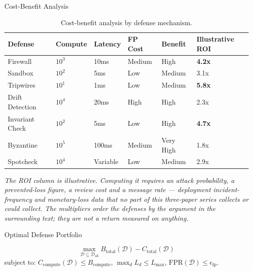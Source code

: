 \documentclass[
  ignorenonframetext,
]{beamer}
\begin{document}
\begin{frame}[allowframebreaks]{Cost-Benefit Analysis}
\begin{table}[htbp]
\centering
\caption{Cost-benefit analysis by defense mechanism.}
\label{tab:cost-benefit}
\begin{tabular}{@{}llllll@{}}
\toprule
Defense & Compute & Latency & FP Cost & Benefit & Illustrative ROI \\
\midrule
Firewall & $10^3$ & 10ms & Medium & High & \textbf{4.2x} \\
Sandbox & $10^2$ & 5ms & Low & Medium & 3.1x \\
Tripwires & $10^1$ & 1ms & Low & Medium & \textbf{5.8x} \\
Drift Detection & $10^4$ & 20ms & High & High & 2.3x \\
Invariant Check & $10^2$ & 5ms & Low & High & \textbf{4.7x} \\
Byzantine & $10^5$ & 100ms & Medium & Very High & 1.8x \\
Spotcheck & $10^4$ & Variable & Low & Medium & 2.9x \\
\bottomrule
\end{tabular}

\vspace{0.5em}
\footnotesize\textit{The ROI column is illustrative. Computing it requires an attack probability, a prevented-loss figure, a review cost and a message rate --- deployment incident-frequency and monetary-loss data that no part of this three-paper series collects or could collect. The multipliers order the defenses by the argument in the surrounding text; they are not a return measured on anything.}
\end{table}
\end{frame}

\begin{frame}[allowframebreaks]{Optimal Defense Portfolio}
\protect{}\label{optimal-defense-portfolio}
\begin{definition}
\label{def:portfolio-opt}
\begin{equation}
\label{eq:portfolio-opt}
\max_{\mathcal{D} \subseteq \mathcal{D}_{\text{all}}} B_{\text{total}}(\mathcal{D}) - C_{\text{total}}(\mathcal{D})
\end{equation}
subject to: $C_{\text{compute}}(\mathcal{D}) \leq B_{\text{compute}}$, $\max_d L_d \leq L_{\max}$, $\text{FPR}(\mathcal{D}) \leq \epsilon_{\text{fp}}$.
\end{definition}

\end{frame}
\end{document}
